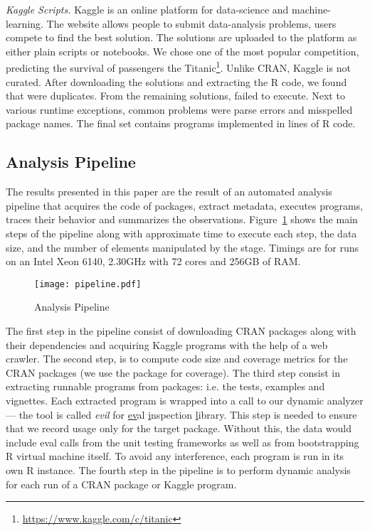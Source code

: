 \documentclass[USenglish,cleveref, autoref, thm-restate]{lipics-v2019}
\newcommand{\mypara}[1]{\medskip\noindent\emph{#1}\xspace}
\begin{document}
\mypara{Kaggle Scripts.} Kaggle is an online platform
for data-science and machine-learning. The website allows people to
submit data-analysis problems, users compete to find the best
solution. The solutions are uploaded to the platform as either plain
scripts or notebooks. We chose one of the most popular competition,
predicting the survival of passengers the
Titanic\footnote{\url{https://www.kaggle.com/c/titanic}}. Unlike CRAN,
Kaggle is not curated. After downloading the \CorpusKaggle solutions
and extracting the R code, we found that \CorpusDuplicatedKaggle were
duplicates. From the remaining \CorpusRunnableKaggle solutions,
\CorpusFailedKaggle failed to execute. Next to various runtime
exceptions, common problems were parse errors and misspelled package
names. The final set contains \CorpusFinishedKaggle programs
implemented in \CorpusFinishedKaggleCodeRnd lines of R code.



\subsection{Analysis Pipeline}

The results presented in this paper are the result of an automated
analysis pipeline that acquires the code of packages, extract
metadata, executes programs, traces their behavior and summarizes the
observations. Figure~\ref{fig:pipeline} shows the main steps of the
pipeline along with approximate time to execute each step, the data
size, and the number of elements manipulated by the stage. Timings are
for runs on an Intel Xeon 6140, 2.30GHz with 72 cores and 256GB of
RAM.

\begin{figure}[!h]\hspace{-5mm}
  \texttt{[image: pipeline.pdf]}
  \caption{Analysis Pipeline}\label{fig:pipeline}
\end{figure}

The first step in the pipeline consist of downloading CRAN packages
along with their dependencies and acquiring Kaggle programs with the
help of a web crawler. The second step, is to compute code size and
coverage metrics for the CRAN packages (we use the \covr package for
coverage). The third step consist in extracting runnable programs from
packages: i.e. the tests, examples and vignettes. Each extracted
program is wrapped into a call to our dynamic analyzer --- the tool is
called \emph{evil} for \underline{ev}al \underline{i}nspection
\underline{l}ibrary. This step is needed to ensure that we record
\eval usage only for the target package. Without this, the data would
include eval calls from the unit testing frameworks as well as from
bootstrapping R virtual machine itself. To avoid any interference,
each program is run in its own R instance.
The fourth step in the pipeline is to perform dynamic analysis for
each run of a CRAN package or Kaggle program.
\end{document}
